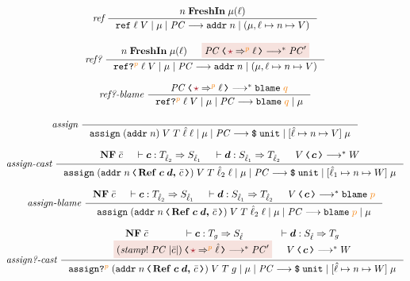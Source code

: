 \begin{figure}[tbp]
\raggedright
  {\footnotesize
  \begin{gather*}
  \textit{ref}~
  \inference{n \; \mathbf{FreshIn} \; \mu(\ell)}
  {\reduce{\ccref{\ell}{V}}{\mu}{\PC}{\ccaddr{n}}{(\mu , \ell \mapsto n \mapsto V)}}
  \\[2ex]
  \textit{ref?}~
  \inference{n \; \mathbf{FreshIn} \; \mu(\ell) & \highlightred{\cccast{\PC}{\unk \Rightarrow^{\bl{p}} \ell} \longrightarrow^{*} \PC'} }
  {\reduce{\ccrefproj{\ell}{V}{p}}{\mu}{\PC}{\ccaddr{n}}{(\mu , \ell \mapsto n \mapsto V)}}
  \\[2ex]
  \textit{ref?-blame}~
  \inference{\cccast{\PC}{\unk \Rightarrow^{\bl{p}} \ell} \longrightarrow^{*} \blame{q}}
  {\reduce{\ccrefproj{\ell}{V}{p}}{\mu}{\PC}{\blame{q}}{\mu}}
  \\[2ex]
  \textit{assign}~
  \inference{}{\reduce{\ccassign{(\ccaddr{n})}{V}{T}{\hat{\ell}}{\ell}}{\mu}{\PC}{\ccconst{\unit}}{[\hat{\ell} \mapsto n \mapsto V] \; \mu}}
  \\[2ex]
  \textit{assign-cast}~
  \inference{\mathbf{NF}\;\bar{c} & \vdash \bm{c} : T_{\hat{\ell}_2} \Rightarrow S_{\hat{\ell}_1} & \vdash \bm{d} : S_{\hat{\ell}_1} \Rightarrow T_{\hat{\ell}_2} & \cccast{V}{\bm{c}} \longrightarrow^{*} W}
  {\reduce{\ccassign{\left(\cccast{\ccaddr{n}}{\coerc{\refco{\bm{c}}{\bm{d}}}{\bar{c}}}\right)}{V}{T}{\hat{\ell}_2}{\ell}}{\mu}{\PC}{\ccconst{\unit}}{[\hat{\ell}_1 \mapsto n \mapsto W] \; \mu}}
  \\[2ex]
  \textit{assign-blame}~
  \inference{\mathbf{NF}\;\bar{c} & \vdash \bm{c} : T_{\hat{\ell}_2} \Rightarrow S_{\hat{\ell}_1} & \vdash \bm{d} : S_{\hat{\ell}_1} \Rightarrow T_{\hat{\ell}_2} & \cccast{V}{\bm{c}} \longrightarrow^{*} \blame{p}}
  {\reduce{\ccassign{\left(\cccast{\ccaddr{n}}{\coerc{\refco{\bm{c}}{\bm{d}}}{\bar{c}}}\right)}{V}{T}{\hat{\ell}_2}{\ell}}{\mu}{\PC}{\blame{p}}{\mu}}
  \\[2ex]
  \textit{assign?-cast}~
  \inference{\mathbf{NF}\;\bar{c} & \vdash \bm{c} : T_g \Rightarrow S_{\hat{\ell}} & \vdash \bm{d} : S_{\hat{\ell}} \Rightarrow T_g \\ \highlightred{\cccast{(\mathit{stamp!}\;\PC\;|\bar{c}|)}{\unk \Rightarrow^{\bl{p}} \hat{\ell}} \longrightarrow^{*} \PC'} & \cccast{V}{\bm{c}} \longrightarrow^{*} W}
  {\reduce{\ccassignproj{\left(\cccast{\ccaddr{n}}{\coerc{\refco{\bm{c}}{\bm{d}}}{\bar{c}}}\right)}{V}{T}{g}{p}}{\mu}{\PC}{\ccconst{\unit}}{[\hat{\ell} \mapsto n \mapsto W] \; \mu}}
  \\[2ex]

\end{gather*}}
\end{figure}
